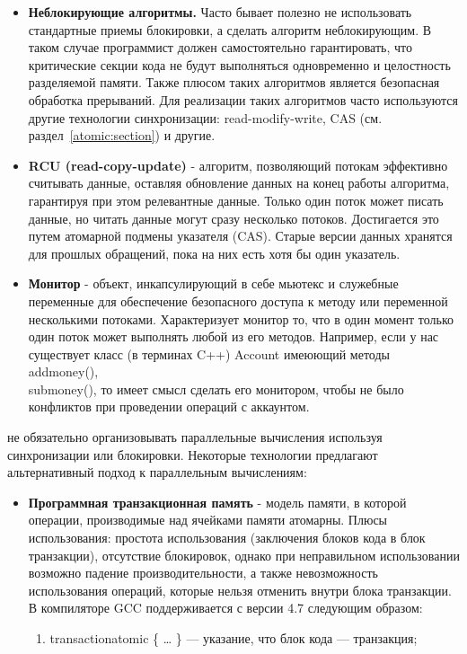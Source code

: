 {\begin{itemize}
			\item\textbf{Неблокирующие алгоритмы.} Часто бывает полезно не использовать стандартные приемы блокировки, а сделать алгоритм неблокирующим. В таком случае программист должен самостоятельно гарантировать, что критические секции кода не будут выполняться одновременно и целостность разделяемой памяти. Также плюсом таких алгоритмов является безопасная обработка прерываний. Для реализации таких алгоритмов часто используются другие технологии синхронизации: read-modify-write, CAS (см. раздел~\ref{atomic:section}) и другие.
			\item\textbf{RCU (read-copy-update)} - алгоритм, позволяющий потокам эффективно считывать данные, оставляя обновление данных на конец работы алгоритма, гарантируя при этом релевантные данные. Только один поток может писать данные, но читать данные могут сразу несколько потоков. Достигается это путем атомарной подмены указателя (CAS). Старые версии данных хранятся для прошлых обращений, пока на них есть хотя бы один указатель.
			\item\textbf{Монитор} - объект, инкапсулирующий в себе мьютекс и служебные переменные для обеспечение безопасного доступа к методу или переменной несколькими потоками. Характеризует монитор то, что в один момент только один поток может выполнять любой из его методов. Например, если у нас существует класс (в терминах C++) Account имеюющий методы add\textunderscore money(),\\sub\textunderscore money(), то имеет смысл сделать его монитором, чтобы не было конфликтов при проведении операций с аккаунтом.
		\end{itemize}
		 не обязательно организовывать параллельные вычисления используя синхронизации или блокировки. Некоторые технологии предлагают альтернативный подход к параллельным вычислениям: 
		\begin{itemize}
			\item\textbf{Программная транзакционная память} - модель памяти, в которой операции, производимые над ячейками памяти атомарны. Плюсы использования: простота использования (заключения блоков кода в блок транзакции), отсутствие блокировок, однако при неправильном использовании возможно падение производительности, а также невозможность использования операций, которые нельзя отменить внутри блока транзакции. В компиляторе GCC поддерживается с версии 4.7 следующим образом: 
				\begin{enumerate}
					\item\textunderscore \textunderscore transaction\textunderscore atomic \{ … \} — указание, что блок кода — транзакция;

\end{enumerate}
\end{itemize}}
